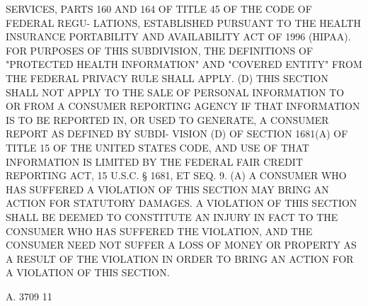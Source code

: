  SERVICES,  PARTS  160  AND  164 OF TITLE 45 OF THE CODE OF FEDERAL REGU-
 LATIONS, ESTABLISHED PURSUANT TO THE HEALTH  INSURANCE  PORTABILITY  AND
 AVAILABILITY  ACT OF 1996 (HIPAA). FOR PURPOSES OF THIS SUBDIVISION, THE
 DEFINITIONS OF "PROTECTED HEALTH INFORMATION" AND "COVERED ENTITY"  FROM
 THE FEDERAL PRIVACY RULE SHALL APPLY.
   (D)  THIS  SECTION SHALL NOT APPLY TO THE SALE OF PERSONAL INFORMATION
 TO OR FROM A CONSUMER REPORTING AGENCY IF  THAT  INFORMATION  IS  TO  BE
 REPORTED IN, OR USED TO GENERATE, A CONSUMER REPORT AS DEFINED BY SUBDI-
 VISION (D) OF SECTION 1681(A) OF TITLE 15 OF THE UNITED STATES CODE, AND
 USE  OF THAT INFORMATION IS LIMITED BY THE FEDERAL FAIR CREDIT REPORTING
 ACT, 15 U.S.C. § 1681, ET SEQ.
   9. (A) A CONSUMER WHO HAS SUFFERED A VIOLATION  OF  THIS  SECTION  MAY
 BRING AN ACTION FOR STATUTORY DAMAGES. A VIOLATION OF THIS SECTION SHALL
 BE  DEEMED  TO  CONSTITUTE  AN  INJURY  IN  FACT TO THE CONSUMER WHO HAS
 SUFFERED THE VIOLATION, AND THE CONSUMER NEED NOT SUFFER A LOSS OF MONEY
 OR PROPERTY AS A RESULT OF THE VIOLATION IN ORDER TO BRING AN ACTION FOR
 A VIOLATION OF THIS SECTION.

 A. 3709                            11
 
